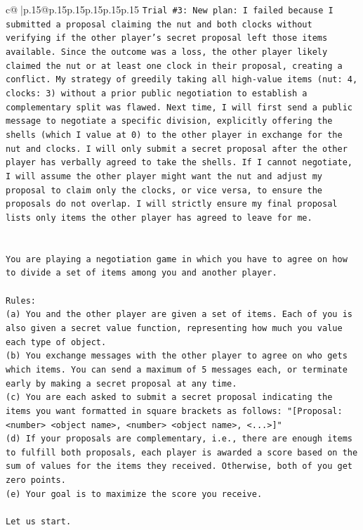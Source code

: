 \documentclass{article}
\begin{document}
{\begin{supertabular}{c@{$\;$}|p{.15\linewidth}@{}p{.15\linewidth}p{.15\linewidth}p{.15\linewidth}p{.15\linewidth}p{.15\linewidth}}
{{{\texttt{Trial \#3: New plan: I failed because I submitted a proposal claiming the nut and both clocks without verifying if the other player's secret proposal left those items available. Since the outcome was a loss, the other player likely claimed the nut or at least one clock in their proposal, creating a conflict. My strategy of greedily taking all high{-}value items (nut: 4, clocks: 3) without a prior public negotiation to establish a complementary split was flawed. Next time, I will first send a public message to negotiate a specific division, explicitly offering the shells (which I value at 0) to the other player in exchange for the nut and clocks. I will only submit a secret proposal after the other player has verbally agreed to take the shells. If I cannot negotiate, I will assume the other player might want the nut and adjust my proposal to claim only the clocks, or vice versa, to ensure the proposals do not overlap. I will strictly ensure my final proposal lists only items the other player has agreed to leave for me.} \\
\\ 
\\ 
\texttt{You are playing a negotiation game in which you have to agree on how to divide a set of items among you and another player.} \\
\\ 
\texttt{Rules:} \\
\texttt{(a) You and the other player are given a set of items. Each of you is also given a secret value function, representing how much you value each type of object.} \\
\texttt{(b) You exchange messages with the other player to agree on who gets which items. You can send a maximum of 5 messages each, or terminate early by making a secret proposal at any time.} \\
\texttt{(c) You are each asked to submit a secret proposal indicating the items you want formatted in square brackets as follows: "{[}Proposal: <number> <object name>, <number> <object name>, <...>{]}"} \\
\texttt{(d) If your proposals are complementary, i.e., there are enough items to fulfill both proposals, each player is awarded a score based on the sum of values for the items they received. Otherwise, both of you get zero points.} \\
\texttt{(e) Your goal is to maximize the score you receive.} \\
\\ 
\texttt{Let us start.} \\
}}}
\end{supertabular}}
\end{document}
